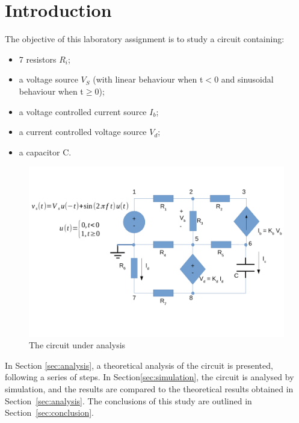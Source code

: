 \section{Introduction}
\label{sec:introduction}

The objective of this laboratory assignment is to study a circuit containing:
\begin{itemize}
 \item 7 resistors $R_i$;
 \item a voltage source $V_S$ (with linear behaviour when t$<$0 and sinusoidal behaviour when t$\geq$0);
 \item a voltage controlled current source $I_b$;
 \item a current controlled voltage source $V_d$;
 \item a capacitor C.
\end{itemize}

\begin{figure}[h] \centering
\includegraphics[width=0.8\linewidth]{rc.pdf}
\caption{The circuit under analysis}
\label{fig:rc}
\end{figure}

In Section \ref{sec:analysis}, a theoretical analysis of the circuit is
presented, following a series of steps. In Section\ref{sec:simulation}, the circuit is analysed by
simulation, and the results are compared to the theoretical results obtained in
Section~\ref{sec:analysis}. The conclusions of this study are outlined in
Section~\ref{sec:conclusion}.






